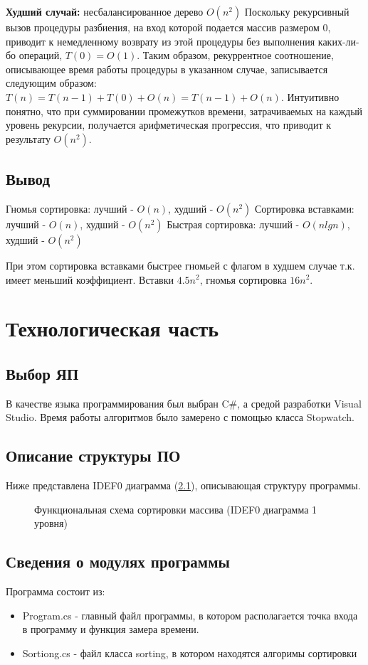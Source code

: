 \documentclass[12pt]{report}
\begin{document}
	\textbf{Худший случай:} несбалансированное дерево $O(n^2)$
	Поскольку рекурсивный вызов процедуры разбиения, на вход которой подается массив размером 0, приводит к немедленному возврату из этой процедуры без выполнения каких-ли-бо операций, $T(0) = O(1)$. Таким образом, рекуррентное соотношение, описывающее время работы процедуры в указанном случае, записывается следующим образом: 
	$T(n) =T(n-1) +T(0) + O(n) =T(n-1) + O(n)$. Интуитивно понятно, что при суммировании промежутков времени, затрачиваемых на каждый уровень рекурсии, получается арифметическая прогрессия, что приводит к результату $O(n^2)$.
	
	\section{Вывод}
	Гномья сортировка: лучший - $O(n)$, худший - $O(n^2)$ \newline
	Сортировка вставками: лучший - $O(n)$, худший - $O(n^2)$ \newline
	Быстрая сортировка: лучший - $O(nlgn)$, худший - $O(n^2)$ \newline
	
	При этом сортировка вставками быстрее гномьей с флагом в худшем случае т.к. имеет меньший коэффициент. Вставки $4.5n^2$, гномья сортировка $16n^2$.
	
	
	\chapter{Технологическая часть}
	\section{Выбор ЯП}
	В качестве языка программирования был выбран C\#, а средой разработки Visual Studio.
	Время работы алгоритмов было замерено с помощью класса Stopwatch.
	
	\section{Описание структуры ПО}
	Ниже представлена IDEF0 диаграмма (\ref{ris:imageIDEF}), описывающая структуру программы.
	\begin{figure}[h]
		\caption{Функциональная схема сортировки массива (IDEF0 диаграмма 1 уровня)}
		\label{ris:imageIDEF}
	\end{figure}
	
	\section{Сведения о модулях программы}
	Программа состоит из:
	\begin{itemize}
		\item Program.cs - главный файл программы, в котором располагается точка входа в программу и функция замера времени.
		\item Sortiong.cs - файл класса sorting, в котором находятся алгоримы сортировки
	\end{itemize}
	
\end{document}
